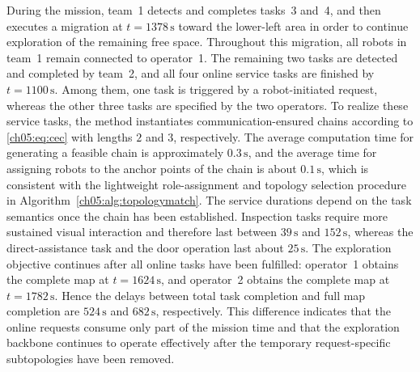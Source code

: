 During the mission, team~1 detects and completes tasks~3 and~4, and
then executes a migration at \(t=1378\,\mathrm{s}\) toward the
lower-left area in order to continue exploration of the remaining free
space. Throughout this migration, all robots in team~1 remain connected
to operator~1. The remaining two tasks are detected and completed by
team~2, and all four online service tasks are finished by
\(t=1100\,\mathrm{s}\). Among them, one task is triggered by a
robot-initiated request, whereas the other three tasks are specified by
the two operators. To realize these service tasks, the method
instantiates communication-ensured chains according to
\eqref{ch05:eq:cec} with lengths \(2\) and \(3\), respectively. The
average computation time for generating a feasible chain is
approximately \(0.3\,\mathrm{s}\), and the average time for assigning
robots to the anchor points of the chain is about \(0.1\,\mathrm{s}\),
which is consistent with the lightweight role-assignment and topology
selection procedure in Algorithm~\ref{ch05:alg:topologymatch}. The
service durations depend on the task semantics once the chain has been
established. Inspection tasks require more sustained visual interaction
and therefore last between \(39\,\mathrm{s}\) and \(152\,\mathrm{s}\),
whereas the direct-assistance task and the door operation last about
\(25\,\mathrm{s}\). The exploration objective continues after all
online tasks have been fulfilled: operator~1 obtains the complete map
at \(t=1624\,\mathrm{s}\), and operator~2 obtains the complete map at
\(t=1782\,\mathrm{s}\). Hence the delays between total task completion
and full map completion are \(524\,\mathrm{s}\) and \(682\,\mathrm{s}\),
respectively. This difference indicates that the online requests
consume only part of the mission time and that the exploration backbone
continues to operate effectively after the temporary request-specific
subtopologies have been removed.

